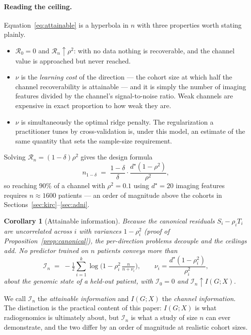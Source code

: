 \documentclass{article}
\newtheorem{corollary}{Corollary}
\begin{document}
\paragraph{Reading the ceiling.} Equation~\eqref{eq:attainable} is a hyperbola
in $n$ with three properties worth stating plainly.
\begin{itemize}
\item $\mathcal{R}_0=0$ and $\mathcal{R}_n\uparrow\rho^2$: with no data nothing
is recoverable, and the channel value is approached but never reached.
\item $\nu$ is the \emph{learning cost} of the direction --- the cohort size at
which half the channel recoverability is attainable --- and it is simply the
number of imaging features divided by the channel's signal-to-noise ratio.
Weak channels are expensive in exact proportion to how weak they are.
\item $\nu$ is simultaneously the optimal ridge penalty. The regularization a
practitioner tunes by cross-validation is, under this model, an estimate of the
same quantity that sets the sample-size requirement.
\end{itemize}
Solving $\mathcal{R}_n=(1-\delta)\rho^2$ gives the design formula
\begin{equation}
n_{1-\delta} \;=\; \frac{1-\delta}{\delta}\cdot\frac{d^\star(1-\rho^2)}{\rho^2},
\label{eq:design-n}
\end{equation}
so reaching $90\%$ of a channel with $\rho^2=0.1$ using $d^\star=20$ imaging
features requires $n\approx 1600$ patients --- an order of magnitude above the
cohorts in Sections~\ref{sec:kirc}--\ref{sec:adni}.

\begin{corollary}[Attainable information]
\label{cor:attainable-info}
Because the canonical residuals $S_i-\rho_i T_i$ are uncorrelated across $i$
with variances $1-\rho_i^2$ (proof of Proposition~\ref{prop:canonical}), the
per-direction problems decouple and the ceilings add. No predictor trained on
$n$ patients conveys more than
\begin{equation}
\boxed{\;
\mathcal{I}_n \;=\; -\tfrac12\sum_{i=1}^{k}\log\!\Big(1-\rho_i^2\,\tfrac{n}{n+\nu_i}\Big),
\qquad \nu_i=\frac{d^\star(1-\rho_i^2)}{\rho_i^2},
\;}
\label{eq:attainable-info}
\end{equation}
about the genomic state of a held-out patient, with $\mathcal{I}_0=0$ and
$\mathcal{I}_n\uparrow I(G;X)$.
\end{corollary}

We call $\mathcal{I}_n$ the \emph{attainable information} and $I(G;X)$ the
\emph{channel information}. The distinction is the practical content of this
paper: $I(G;X)$ is what radiogenomics is ultimately about, but $\mathcal{I}_n$
is what a study of size $n$ can ever demonstrate, and the two differ by an order
of magnitude at realistic cohort sizes.
\end{document}
